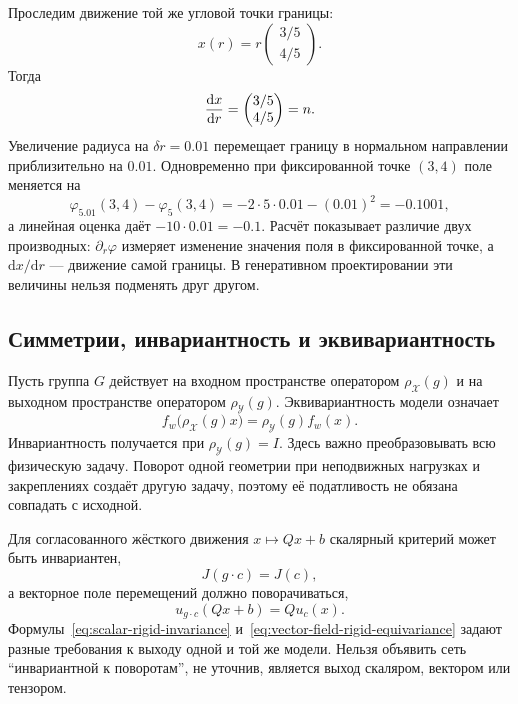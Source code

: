 Проследим движение той же угловой точки границы:
\begin{equation}
 x(r)
 =
 r
 \begin{pmatrix}3/5\\4/5\end{pmatrix}.
\end{equation}
Тогда
\begin{equation}
 \frac{\mathop{}\!\mathrm{d} x}{\mathop{}\!\mathrm{d} r}
 =
 \begin{pmatrix}3/5\\4/5\end{pmatrix}
 =n.
\end{equation}
Увеличение радиуса на $\delta r=0.01$ перемещает границу в нормальном направлении приблизительно на $0.01$. Одновременно при фиксированной точке $(3,4)$ поле меняется на
\begin{equation}
 \varphi_{5.01}(3,4)-\varphi_5(3,4)
 =
 -2\cdot5\cdot0.01-(0.01)^2
 =-0.1001,
\end{equation}
а линейная оценка даёт $-10\cdot0.01=-0.1$. Расчёт показывает различие двух производных: $\partial_r\varphi$ измеряет изменение значения поля в фиксированной точке, а $\mathrm d x/\mathrm d r$ --- движение самой границы. В генеративном проектировании эти величины нельзя подменять друг другом.

\subsection{Симметрии, инвариантность и эквивариантность}
Пусть группа $G$ действует на входном пространстве оператором $\rho_{\mathcal X}(g)$ и на выходном пространстве оператором $\rho_{\mathcal Y}(g)$. Эквивариантность модели означает
\begin{equation}
 f_w\bigl(\rho_{\mathcal X}(g)x\bigr)
 =
 \rho_{\mathcal Y}(g)f_w(x).
\end{equation}
Инвариантность получается при $\rho_{\mathcal Y}(g)=I$. Здесь важно преобразовывать всю физическую задачу. Поворот одной геометрии при неподвижных нагрузках и закреплениях создаёт другую задачу, поэтому её податливость не обязана совпадать с исходной.

Для согласованного жёсткого движения $x\mapsto Qx+b$ скалярный критерий может быть инвариантен,
\begin{equation}
\label{eq:scalar-rigid-invariance}
 J(g\cdot c)=J(c),
\end{equation}
а векторное поле перемещений должно поворачиваться,
\begin{equation}
\label{eq:vector-field-rigid-equivariance}
 u_{g\cdot c}(Qx+b)
 =
 Q u_c(x).
\end{equation}
Формулы~\eqref{eq:scalar-rigid-invariance} и~\eqref{eq:vector-field-rigid-equivariance} задают разные требования к выходу одной и той же модели. Нельзя объявить сеть ``инвариантной к поворотам'', не уточнив, является выход скаляром, вектором или тензором.

